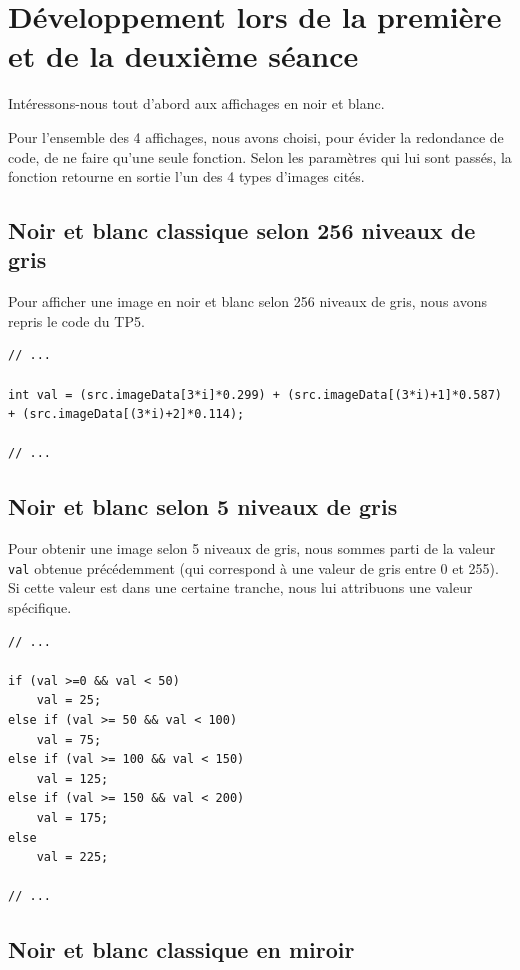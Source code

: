 \chapter{Développement lors de la première et de la deuxième séance}

Intéressons-nous tout d'abord aux affichages en noir et blanc.

\medskip

Pour l'ensemble des 4 affichages, nous avons choisi, pour évider la redondance de code, de ne faire qu'une seule fonction. Selon les paramètres qui lui sont passés, la fonction retourne en sortie l'un des 4 types d'images cités.

\section{Noir et blanc classique selon 256 niveaux de gris}

Pour afficher une image en noir et blanc selon 256 niveaux de gris, nous avons repris le code du TP5.

\cpp
\begin{lstlisting}
// ...

int val = (src.imageData[3*i]*0.299) + (src.imageData[(3*i)+1]*0.587) + (src.imageData[(3*i)+2]*0.114);

// ...
\end{lstlisting}

\section{Noir et blanc selon 5 niveaux de gris}
Pour obtenir une image selon 5 niveaux de gris, nous sommes parti de la valeur \lstinline{val} obtenue précédemment (qui correspond à une valeur de gris entre 0 et 255). Si cette valeur est dans une certaine \og tranche\fg{}, nous lui attribuons une valeur spécifique.

\begin{lstlisting}
// ...

if (val >=0 && val < 50)
	val = 25;
else if (val >= 50 && val < 100)
	val = 75;
else if (val >= 100 && val < 150)
	val = 125;
else if (val >= 150 && val < 200)
	val = 175;
else
	val = 225;

// ...
\end{lstlisting}

\section{Noir et blanc classique en miroir}

